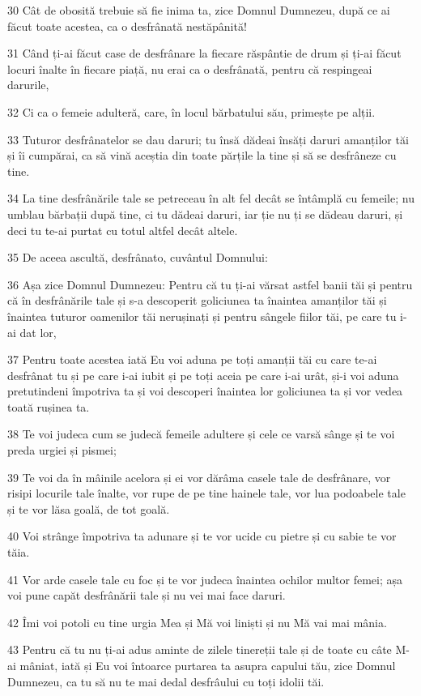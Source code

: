 \par 30 Cât de obosită trebuie să fie inima ta, zice Domnul Dumnezeu, după ce ai făcut toate acestea, ca o desfrânată nestăpânită!
\par 31 Când ți-ai făcut case de desfrânare la fiecare răspântie de drum și ți-ai făcut locuri înalte în fiecare piață, nu erai ca o desfrânată, pentru că respingeai darurile,
\par 32 Ci ca o femeie adulteră, care, în locul bărbatului său, primește pe alții.
\par 33 Tuturor desfrânatelor se dau daruri; tu însă dădeai însăți daruri amanților tăi și îi cumpărai, ca să vină aceștia din toate părțile la tine și să se desfrâneze cu tine.
\par 34 La tine desfrânările tale se petreceau în alt fel decât se întâmplă cu femeile; nu umblau bărbații după tine, ci tu dădeai daruri, iar ție nu ți se dădeau daruri, și deci tu te-ai purtat cu totul altfel decât altele.
\par 35 De aceea ascultă, desfrânato, cuvântul Domnului:
\par 36 Așa zice Domnul Dumnezeu: Pentru că tu ți-ai vărsat astfel banii tăi și pentru că în desfrânările tale și s-a descoperit goliciunea ta înaintea amanților tăi și înaintea tuturor oamenilor tăi nerușinați și pentru sângele fiilor tăi, pe care tu i-ai dat lor,
\par 37 Pentru toate acestea iată Eu voi aduna pe toți amanții tăi cu care te-ai desfrânat tu și pe care i-ai iubit și pe toți aceia pe care i-ai urât, și-i voi aduna pretutindeni împotriva ta și voi descoperi înaintea lor goliciunea ta și vor vedea toată rușinea ta.
\par 38 Te voi judeca cum se judecă femeile adultere și cele ce varsă sânge și te voi preda urgiei și pismei;
\par 39 Te voi da în mâinile acelora și ei vor dărâma casele tale de desfrânare, vor risipi locurile tale înalte, vor rupe de pe tine hainele tale, vor lua podoabele tale și te vor lăsa goală, de tot goală.
\par 40 Voi strânge împotriva ta adunare și te vor ucide cu pietre și cu sabie te vor tăia.
\par 41 Vor arde casele tale cu foc și te vor judeca înaintea ochilor multor femei; așa voi pune capăt desfrânării tale și nu vei mai face daruri.
\par 42 Îmi voi potoli cu tine urgia Mea și Mă voi liniști și nu Mă vai mai mânia.
\par 43 Pentru că tu nu ți-ai adus aminte de zilele tinereții tale și de toate cu câte M-ai mâniat, iată și Eu voi întoarce purtarea ta asupra capului tău, zice Domnul Dumnezeu, ca tu să nu te mai dedal desfrâului cu toți idolii tăi.
